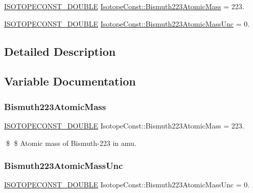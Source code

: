 \begin{DoxyCompactItemize}
\item 
\mbox{\hyperlink{group___isotope_const-_macros_ga8f45a7272ce02c0b4c65c44636ed719a}{I\+S\+O\+T\+O\+P\+E\+C\+O\+N\+S\+T\+\_\+\+D\+O\+U\+B\+LE}} \mbox{\hyperlink{group___isotope_const-_bismuth-_bi223_gae43e5f6e8d342dc995766874ba22f27a}{Isotope\+Const\+::\+Bismuth223\+Atomic\+Mass}} = 223.
\item 
\mbox{\hyperlink{group___isotope_const-_macros_ga8f45a7272ce02c0b4c65c44636ed719a}{I\+S\+O\+T\+O\+P\+E\+C\+O\+N\+S\+T\+\_\+\+D\+O\+U\+B\+LE}} \mbox{\hyperlink{group___isotope_const-_bismuth-_bi223_ga6aa0a46f1031f28f2ca8f597f6920d2c}{Isotope\+Const\+::\+Bismuth223\+Atomic\+Mass\+Unc}} = 0.
\end{DoxyCompactItemize}


\subsection{Detailed Description}


\subsection{Variable Documentation}
\mbox{\label{group___isotope_const-_bismuth-_bi223_gae43e5f6e8d342dc995766874ba22f27a}} 
\subsubsection{\texorpdfstring{Bismuth223\+Atomic\+Mass}{Bismuth223AtomicMass}}
{\footnotesize\ttfamily \mbox{\hyperlink{group___isotope_const-_macros_ga8f45a7272ce02c0b4c65c44636ed719a}{I\+S\+O\+T\+O\+P\+E\+C\+O\+N\+S\+T\+\_\+\+D\+O\+U\+B\+LE}} Isotope\+Const\+::\+Bismuth223\+Atomic\+Mass = 223.}

\$ \$ Atomic mass of Bismuth-\/223 in amu. \mbox{\label{group___isotope_const-_bismuth-_bi223_ga6aa0a46f1031f28f2ca8f597f6920d2c}} 
\subsubsection{\texorpdfstring{Bismuth223\+Atomic\+Mass\+Unc}{Bismuth223AtomicMassUnc}}
{\footnotesize\ttfamily \mbox{\hyperlink{group___isotope_const-_macros_ga8f45a7272ce02c0b4c65c44636ed719a}{I\+S\+O\+T\+O\+P\+E\+C\+O\+N\+S\+T\+\_\+\+D\+O\+U\+B\+LE}} Isotope\+Const\+::\+Bismuth223\+Atomic\+Mass\+Unc = 0.}

